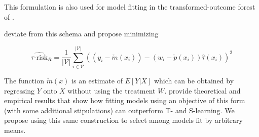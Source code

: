 This formulation is also used for model fitting in the transformed-outcome forest of \citet{Powers:2017wd}.

\citet{Nie:2017vi} deviate from this schema and propose minimizing

\begin{equation}
\widehat{\tau\text{-risk}}_{R} = 
	\frac{1}{|\mathcal{V}|}\sum_{i \in \mathcal{V}}^{|\mathcal{V}|}  
	((y_i - \check m(x_i)) - (w_i - \check p(x_i))\hat\tau (x_i))^2
\label{trisk-r}
\end{equation}

The function $\check m(x)$ is an estimate of $E[Y|X]$ which can be obtained by regressing $Y$ onto $X$ without using the treatment $W$. \citet{Nie:2017vi} provide theoretical and empirical results that show how fitting models using an objective of this form (with some additional stipulations) can outperform T- and S-learning. We propose using this same construction to select among models fit by arbitrary means.

